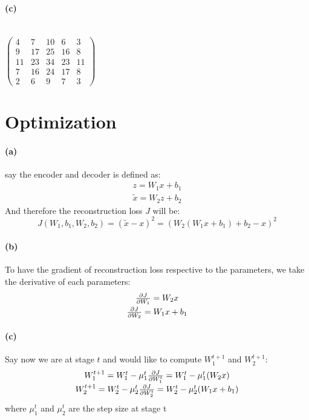 \documentclass{article}
\begin{document}
\paragraph{(c)} \\
$\begin{pmatrix}
  4 & 7 & 10 & 6 & 3 \\[0.4em]
  9 & 17 & 25 & 16 & 8 \\[0.4em]
  11 & 23 & 34 & 23 & 11 \\[0.4em]
  7 & 16 & 24 & 17 & 8 \\[0.4em]
  2 & 6 & 9 &7 & 3
\end{pmatrix}$ \\


\section{Optimization}
\paragraph{(a)} say the encoder and decoder is defined as:
\begin{equation}
\begin{matrix}
z = W_1x + b_1 \\[0.4em]
\tilde{x} = W_2z + b_2
\end{matrix}
\end{equation}
And therefore the reconstruction loss $J$ will be:
\begin{equation}
J(W_1, b_1, W_2, b_2) = (\tilde{x}-x)^2 = (W_2(W_1x+b_1)+b_2-x)^2
\end{equation}

\paragraph{(b)} To have the gradient of reconstruction loss respective to the parameters, we take the derivative of each parameters:
\begin{equation}
\begin{matrix}
{\partial J \over \partial W_1} = W_2x \\[0.4em]
{\partial J \over \partial W_2} = W_1x + b_1
\end{matrix}
\end{equation}

\paragraph{(c)} Say now we are at stage $t$ and would like to compute $W_1^{t+1}$ and $W_2^{t+1}$:
\begin{equation}
\begin{matrix}
W_1^{t+1} = W_1^t - \mu_1^t {\partial J \over \partial W_1^t} = W_1^t - \mu_1^t(W_2x) \\[0.4em]
W_2^{t+1} = W_2^t - \mu_2^t {\partial J \over \partial W_2^t} = W_2^t - \mu_2^t(W_1x+b_1)
\end{matrix}
\end{equation}
where $\mu_1^t$ and $\mu_2^t$ are the step size at stage t
\end{document}
